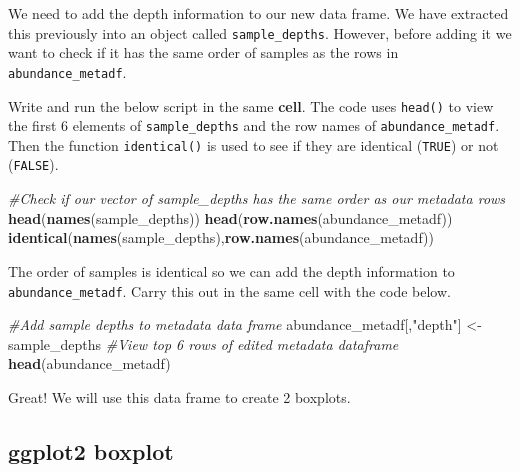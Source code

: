 \documentclass[
]{book}
\newenvironment{Shaded}{\begin{snugshade}}{\end{snugshade}}
\newcommand{\CommentTok}[1]{\textcolor[rgb]{0.56,0.35,0.01}{\textit{#1}}}
\newcommand{\FunctionTok}[1]{\textcolor[rgb]{0.13,0.29,0.53}{\textbf{#1}}}
\newcommand{\NormalTok}[1]{#1}
\newcommand{\OtherTok}[1]{\textcolor[rgb]{0.56,0.35,0.01}{#1}}
\newcommand{\StringTok}[1]{\textcolor[rgb]{0.31,0.60,0.02}{#1}}
\begin{document}
We need to add the depth information to our new data frame.
We have extracted this previously into an object called \texttt{sample\_depths}.
However, before adding it we want to check if it has the same order of samples as the rows in \texttt{abundance\_metadf}.

Write and run the below script in the same \textbf{cell}. The code uses \texttt{head()} to view the first 6 elements of \texttt{sample\_depths} and the row names of \texttt{abundance\_metadf}. Then the function \texttt{identical()} is used to see if they are identical (\texttt{TRUE}) or not (\texttt{FALSE}).

\begin{Shaded}
\begin{Highlighting}[]
\CommentTok{\#Check if our vector of sample\_depths has the same order as our metadata rows}
\FunctionTok{head}\NormalTok{(}\FunctionTok{names}\NormalTok{(sample\_depths))}
\FunctionTok{head}\NormalTok{(}\FunctionTok{row.names}\NormalTok{(abundance\_metadf))}
\FunctionTok{identical}\NormalTok{(}\FunctionTok{names}\NormalTok{(sample\_depths),}\FunctionTok{row.names}\NormalTok{(abundance\_metadf))}
\end{Highlighting}
\end{Shaded}

The order of samples is identical so we can add the depth information to \texttt{abundance\_metadf}. Carry this out in the same cell with the code below.

\begin{Shaded}
\begin{Highlighting}[]
\CommentTok{\#Add sample depths to metadata data frame}
\NormalTok{abundance\_metadf[,}\StringTok{"depth"}\NormalTok{] }\OtherTok{\textless{}{-}}\NormalTok{ sample\_depths}
\CommentTok{\#View top 6 rows of edited metadata dataframe}
\FunctionTok{head}\NormalTok{(abundance\_metadf)}
\end{Highlighting}
\end{Shaded}

Great! We will use this data frame to create 2 boxplots.

\hypertarget{ggplot2-boxplot}{%
\subsection{ggplot2 boxplot}\label{ggplot2-boxplot}}
\end{document}
